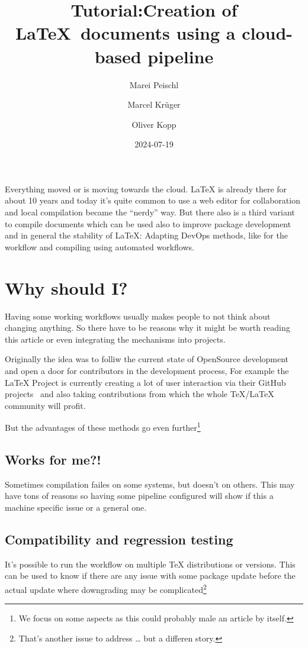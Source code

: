 \documentclass[final]{ltugboat}
\title[TUG2024: LaTeX CI/CD]{Tutorial:\newline Creation of \LaTeX\ documents using a cloud-based pipeline}
\date{2024-07-19}
\author{Marei Peischl}
\author{Marcel Krüger}
\author{Oliver Kopp}
\begin{document}
\maketitle

Everything moved or is moving towards the cloud.
\LaTeX{} is already there for about 10 years and today it's quite common to use a web editor for collaboration and local compilation became the \enquote{nerdy} way.
But there also is a third variant to compile documents which can be used also to improve package development and in general the stability of \LaTeX{}:
Adapting DevOps methods, like  for the workflow and compiling using automated workflows.

\section{Why should I?}
Having some working workflows usually makes people to not think about changing anything.
So there have to be reasons why it might be worth reading this article or even integrating the mechanisms into projects.

Originally the idea was to folliw the current state of OpenSource development and open a door for contributors in the development process,
For example the \LaTeX{} Project is currently creating a lot of user interaction via their GitHub projects~\cite{latex3-github} and also taking contributions from which the whole \TeX/\LaTeX{} community will profit.

But the advantages of these methods go even further\footnote{We focus on some aspects as this could probably male an article by itself.}

\subsection{Works for me?!}
Sometimes compilation failes on some systems, but doesn't on others.
This may have tons of reasons so having some pipeline configured will show if this a machine specific issue or a general one.

\subsection{Compatibility and regression testing}
It's possible to run the workflow on multiple TeX distributions or versions.
This can be used to know if there are any issue with some package update before the actual update where downgrading may be complicated\footnote{That's another issue to address … but a differen story.}
\end{document}
